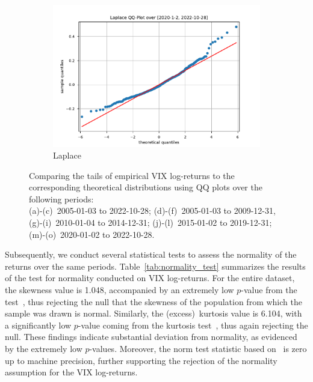 \begin{figure}[htbp]
\begin{subfigure}[b]{0.32\textwidth}
        \includegraphics[width=\textwidth]{content/reschap4/Figures/laplace_QQ_2020-1-2-2022-10-28.pdf}
        \caption{\small Laplace}
    \end{subfigure}
    \vspace*{-0.2\baselineskip}
    \caption{\small Comparing the tails of empirical VIX log-returns to the corresponding theoretical distributions using QQ plots over the following periods: \\ (a)-(c)~{2005-01-03} to {2022-10-28}; (d)-(f)~{2005-01-03} to {2009-12-31}, (g)-(i)~{2010-01-04} to {2014-12-31}; (j)-(l)~{2015-01-02} to {2019-12-31}; (m)-(o)~{2020-01-02} to {2022-10-28}.}\label{fig:QQplots}
\end{figure}

Subsequently, we conduct several statistical tests to assess the normality of the returns over the same periods. Table~\ref{tab:normality_test} summarizes the results of the test for normality conducted on VIX log-returns. For the entire dataset, the skewness value is 1.048, accompanied by an extremely low {$p$\nobreakdash-value} from the test~\cite{DAgostino1990ANormality}, thus rejecting the null that the skewness of the population from which the sample was drawn is normal. Similarly, the (excess)~kurtosis value is 6.104, with a significantly low {$p$\nobreakdash-value} coming from the kurtosis test~\cite{Anscombe1983DistributionSamples}, thus again rejecting the null. These findings indicate substantial deviation from normality, as evidenced by the extremely low {$p$\nobreakdash-values}. Moreover, the norm test statistic based on~\cite{DAgostino1971AnSamples, DAgostino1973Testssqrtb_1} is zero up to machine precision, further supporting the rejection of the normality assumption for the VIX log-returns.

